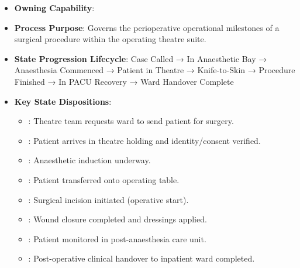 \begin{itemize}

\item 
\textbf{Owning Capability}: \texttt{}



\item 
\textbf{Process Purpose}: Governs the perioperative operational milestones of a surgical procedure within the operating theatre suite.



\item 
\textbf{State Progression Lifecycle}: Case Called → In Anaesthetic Bay → Anaesthesia Commenced → Patient in Theatre → Knife-to-Skin → Procedure Finished → In PACU Recovery → Ward Handover Complete



\item 
\textbf{Key State Dispositions}:


\begin{itemize}

\item 
\texttt{}: Theatre team requests ward to send patient for surgery.



\item 
\texttt{}: Patient arrives in theatre holding and identity/\allowbreak{}consent verified.



\item 
\texttt{}: Anaesthetic induction underway.



\item 
\texttt{}: Patient transferred onto operating table.



\item 
\texttt{}: Surgical incision initiated (operative start).



\item 
\texttt{}: Wound closure completed and dressings applied.



\item 
\texttt{}: Patient monitored in post-anaesthesia care unit.



\item 
\texttt{}: Post-operative clinical handover to inpatient ward completed.



\end{itemize}


\end{itemize}
\label{rad:processes:185}

